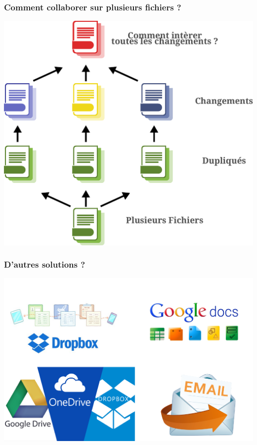 \documentclass[table,tikz,12pt,svgnames]{beamer}
\begin{document}
\begin{frame}
	\frametitle{Comment collaborer sur plusieurs fichiers ? }
	\begin{block}{}
    \begin{adjustwidth}{-0.5cm}{}
		\begin{center}
		{\includegraphics[scale=0.38]{images/file_share_many.pdf}}
		\end{center}
	\end{adjustwidth}
	\end{block}
\end{frame}


\begin{frame}
	\frametitle{D'autres solutions ? }
	\vspace{-4em}
	\begin{block}{}
    \begin{adjustwidth}{-0.5cm}{}
		\begin{center}
		{\includegraphics[scale=0.43]{images/services.pdf}}
		\end{center}
	\end{adjustwidth}
	\end{block}
\end{frame}
\end{document}
